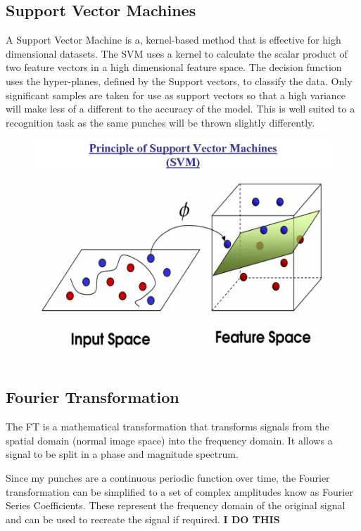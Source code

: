 \subsection{Support Vector Machines}
A Support Vector Machine is a, kernel-based method that is effective for high 
dimensional datasets. The SVM uses a kernel to calculate the scalar product of two feature vectors in a high dimensional feature space. The decision function uses the hyper-planes, defined by the Support  vectors,  to  classify  the  data.  Only  significant  samples  are  taken  for  use  as support vectors so that a high variance will make less of a different to the accuracy of the model. {This is well suited to a recognition task as the same punches will be thrown slightly differently.}

\begin{figure}[h]
    \centering
    \includegraphics[height=0.25\textheight]{fig03/svm}
    \label{fig:kinect}
\end{figure}

\subsection{Fourier Transformation}

The FT is a mathematical transformation that transforms signals from the spatial domain (normal image space) into the frequency domain. It allows a signal to be split in a phase and magnitude spectrum.

Since my punches are a continuous periodic function over time, the Fourier transformation can be simplified to a set of complex amplitudes know as Fourier Series Coefficients. These represent the frequency domain of the original signal and can be used to recreate the signal if required. {\bf I DO THIS}



